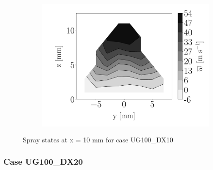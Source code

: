 \begin{figure}[h!]
\begin{subfigure}[b]{0.3\textwidth}
	\centering
   \includegraphics[scale=\scaleSLIJICF]{./part2_developments/figures_ch5_resolved_JICF/injectors_SLI/uG100_dx10_x10_uz_mean_map}
\end{subfigure}
\caption{Spray states at x = 10 mm for case UG100\_DX10}
\label{fig:injectors_sli_uG100_dx10_x10}
\end{figure}


\clearpage

\subsubsection*{Case UG100\_DX20}





